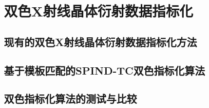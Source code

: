 \chapter{双色X射线晶体衍射数据指标化}

\section{现有的双色X射线晶体衍射数据指标化方法}

\section{基于模板匹配的SPIND-TC双色指标化算法}

\section{双色指标化算法的测试与比较}